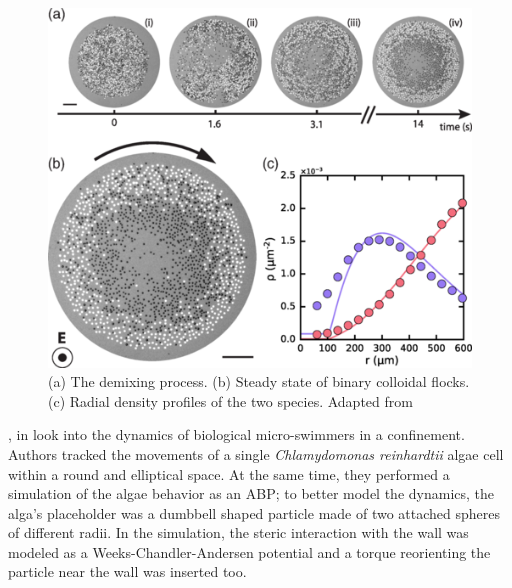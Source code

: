 \documentclass[../../master_thesis_np.tex]{subfiles}
\begin{document}
	\begin{figure}[htp]
		\centering
		\includegraphics[width=\singfigwidth]{maity1.png}
		\caption{(a) The demixing process. (b) Steady state of binary colloidal flocks. (c) Radial density profiles of the two species. Adapted from \cite{maity_spontaneous_2023}}
		\label{fig:maity1}
	\end{figure}
	
	\citeauthor{ostapenko_curvature-guided_2018}, in \cite{ostapenko_curvature-guided_2018} look into the dynamics of biological micro-swimmers in a confinement. 
	Authors tracked the movements of a single \emph{Chlamydomonas reinhardtii} algae cell within a round and elliptical space. 
	At the same time, they performed a simulation of the algae behavior as an ABP; to better model the dynamics, the alga's placeholder was a dumbbell shaped particle made of two attached spheres of different radii. 
	In the simulation, the steric interaction with the wall was modeled as a Weeks-Chandler-Andersen potential and a torque reorienting the particle near the wall was inserted too.
	
\end{document}
